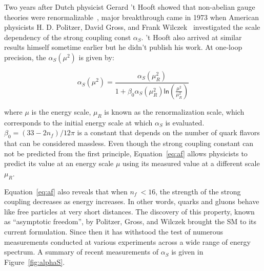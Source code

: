 Two years after Dutch physicist Gerard 't Hooft showed that non-abelian gauge theories were renormalizable~\cite{tHooft:1971akt}, major breakthrough came in 1973 when American physicists H. D. Politzer, David Gross, and Frank Wilczek~\cite{Gross:1973id,Politzer:1973fx} investigated the scale dependency of the strong coupling const $\alpha_{S}$. 't Hooft also arrived at similar results himself sometime earlier but he didn't publish his work. At one-loop precision, the $\alpha_{S}(\mu^2)$ is given by:

\begin{equation}
\label{eq:af}
\alpha_{S}(\mu^2)=\frac{\alpha_{S}(\mu_{R}^2)}{1+\beta_{0}\alpha_{S}(\mu_{R}^2)\textsf{ln}(\frac{\mu^2}{\mu_{R}^2})}
\end{equation}

where $\mu$ is the energy scale, $\mu_{R}$ is known as the renormalization scale, which corresponds to the initial energy scale at which $\alpha_{S}$ is evaluated. $\beta_{0}=(33-2n_{f})/12\pi$ is a constant that depends on the number of quark flavors that can be considered massless. Even though the strong coupling constant can not be predicted from the first principle, Equation~\ref{eq:af} allows physicists to predict its value at an energy scale $\mu$ using its measured value at a different scale $\mu_{R}$.

Equation~\ref{eq:af} also reveals that when $n_{f}~<16$, the strength of the strong coupling decreases as energy increases. In other words, quarks and gluons behave like free particles at very short distances. The discovery of this property, known as ``asymptotic freedom'', by Politzer, Gross, and Wilczek brought the \ac{SM} to its current formulation. Since then it has withstood the test of numerous measurements conducted at various experiments across a wide range of energy spectrum. A summary of recent measurements of $\alpha_{S}$ is given in Figure~\ref{fig:alphaS}.

